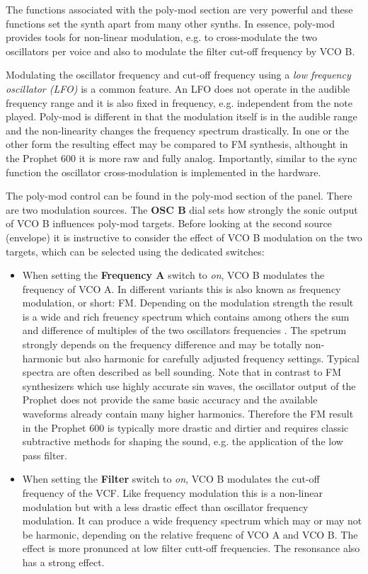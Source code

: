 The functions associated with the poly-mod section are very powerful and these functions set the synth apart from many other synths. In essence, poly-mod provides tools for non-linear modulation, e.g. to cross-modulate the two oscillators per voice and also to modulate the filter cut-off frequency by VCO B. 

Modulating the oscillator frequency and cut-off frequency using a \textit{low frequency oscillator (LFO)} is a common feature. An LFO does not operate in the audible frequency range and it is also fixed in frequency, e.g. independent from the note played. Poly-mod is different in that the modulation itself is in the audible range and the non-linearity changes the frequency spectrum drastically. In one or the other form the resulting effect may be compared to FM synthesis, althought in the Prophet 600 it is more raw and fully analog. Importantly, similar to the sync function the oscillator cross-modulation is implemented in the hardware.

The poly-mod control can be found in the poly-mod section of the panel. There are two modulation sources. The \textbf{OSC B} dial sets how strongly the sonic output of VCO B influences poly-mod targets. Before looking at the second source (envelope) it is instructive to consider the effect of VCO B modulation on the two targets, which can be selected using the dedicated switches:

\begin{itemize}
  \item When setting the \textbf{Frequency A} switch to \textit{on}, VCO B modulates the frequency of VCO A. In different variants this is also known as frequency modulation, or short: FM. Depending on the modulation strength the result is a wide and rich freuency spectrum which contains among others the sum and difference of multiples of the two oscillators frequencies . The spetrum strongly depends on the frequency difference and may be totally non-harmonic but also harmonic for carefully adjusted frequency settings. Typical spectra are often described as bell sounding. Note that in contrast to FM synthesizers which use highly accurate sin waves, the oscillator output of the Prophet does not provide the same basic accuracy and the available waveforms already contain many higher harmonics. Therefore the FM result in the Prophet 600 is typically more drastic and dirtier and requires classic subtractive methods for shaping the sound, e.g. the application of the low pass filter. 
  \item When setting the \textbf{Filter} switch to \textit{on}, VCO B modulates the cut-off frequency of the VCF. Like frequency modulation this is a non-linear modulation but with a less drastic effect than oscillator frequency modulation. It can produce a wide frequency spectrum which may or may not be harmonic, depending on the relative frequenc of VCO A and VCO B. The effect is more pronunced at low filter cutt-off frequencies. The resonsance also has a strong effect.  
\end{itemize}

